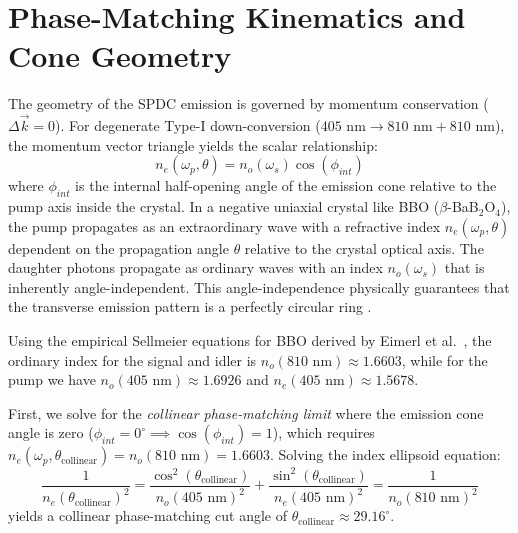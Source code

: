 \documentclass[12pt,a4paper]{article}
\begin{document}
\appendix
\section{Phase-Matching Kinematics and Cone Geometry}

The geometry of the SPDC emission is governed by momentum conservation ($\Delta\vec{k} = 0$). For degenerate Type-I down-conversion ($405\text{ nm} \rightarrow 810\text{ nm} + 810\text{ nm}$), the momentum vector triangle yields the scalar relationship:
\begin{equation}
    n_e(\omega_p, \theta) = n_o(\omega_s) \cos(\phi_{int})
\end{equation}
where $\phi_{int}$ is the internal half-opening angle of the emission cone relative to the pump axis inside the crystal. In a negative uniaxial crystal like BBO ($\beta$-BaB$_2$O$_4$), the pump propagates as an extraordinary wave with a refractive index $n_e(\omega_p, \theta)$ dependent on the propagation angle $\theta$ relative to the crystal optical axis. The daughter photons propagate as ordinary waves with an index $n_o(\omega_s)$ that is inherently angle-independent. This angle-independence physically guarantees that the transverse emission pattern is a perfectly circular ring \cite{guilbert}.

Using the empirical Sellmeier equations for BBO derived by Eimerl et al.\ \cite{eimerl}, the ordinary index for the signal and idler is $n_o(810\text{ nm}) \approx 1.6603$, while for the pump we have $n_o(405\text{ nm}) \approx 1.6926$ and $n_e(405\text{ nm}) \approx 1.5678$.

First, we solve for the \textit{collinear phase-matching limit} where the emission cone angle is zero ($\phi_{int} = 0^\circ \implies \cos(\phi_{int}) = 1$), which requires $n_e(\omega_p, \theta_{\text{collinear}}) = n_o(810\text{ nm}) = 1.6603$. Solving the index ellipsoid equation:
\begin{equation}
    \frac{1}{n_e(\theta_{\text{collinear}})^2} = \frac{\cos^2(\theta_{\text{collinear}})}{n_o(405\text{ nm})^2} + \frac{\sin^2(\theta_{\text{collinear}})}{n_e(405\text{ nm})^2} = \frac{1}{n_o(810\text{ nm})^2}
\end{equation}
yields a collinear phase-matching cut angle of $\theta_{\text{collinear}} \approx 29.16^\circ$.
\end{document}
